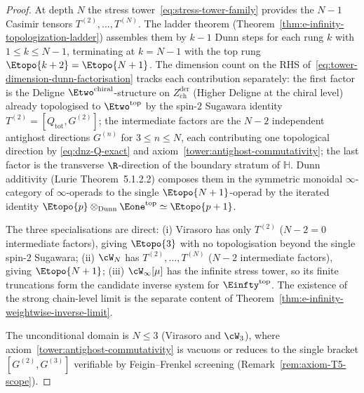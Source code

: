 \begin{proof}
At depth $N$ the stress tower~\eqref{eq:stress-tower-family} provides
the $N - 1$ Casimir tensors $T^{(2)}, \ldots, T^{(N)}$. The ladder
theorem (Theorem~\ref{thm:e-infinity-topologization-ladder}) assembles
them by $k - 1$ Dunn steps for each rung $k$ with $1 \le k \le N - 1$,
terminating at $k = N - 1$ with the top rung $\Etopo{k + 2} = \Etopo{N+1}$.
The dimension count on the RHS of~\eqref{eq:tower-dimension-dunn-factorisation}
tracks each contribution separately: the first factor is the Deligne
$\Etwo^{\mathrm{chiral}}$-structure on $Z^{\mathrm{der}}_{\mathrm{ch}}$
(Higher Deligne at the chiral level) already topologised to
$\Etwo^{\mathrm{top}}$ by the spin-$2$ Sugawara identity
$T^{(2)} = [Q_{\mathrm{tot}}, G^{(2)}]$; the intermediate factors are
the $N - 2$ independent antighost directions $G^{(n)}$ for
$3 \le n \le N$, each contributing one topological direction by
\eqref{eq:dnz-Q-exact} and axiom~\ref{tower:antighost-commutativity};
the last factor is the transverse $\R$-direction of the boundary stratum
of $\mathbb{H}$. Dunn additivity
(Lurie\,\cite{HA}\,Theorem~5.1.2.2) composes them in the symmetric
monoidal $\infty$-category of $\infty$-operads to the single
$\Etopo{N+1}$-operad by the iterated identity
$\Etopo{p} \otimes_{\mathrm{Dunn}} \Eone^{\mathrm{top}} \simeq \Etopo{p+1}$.

The three specialisations are direct: (i) Virasoro has only $T^{(2)}$
($N - 2 = 0$ intermediate factors), giving $\Etopo{3}$ with no
topologisation beyond the single spin-$2$ Sugawara; (ii) $\cW_N$ has
$T^{(2)}, \ldots, T^{(N)}$ ($N - 2$ intermediate factors), giving
$\Etopo{N+1}$; (iii) $\cW_\infty[\mu]$ has the infinite stress tower,
so its finite truncations form the candidate inverse system for
$\Einfty^{\mathrm{top}}$. The existence of the strong chain-level
limit is the separate content of
Theorem~\ref{thm:e-infinity-weightwise-inverse-limit}.

The unconditional domain is $N \le 3$ (Virasoro and $\cW_3$), where
axiom~\ref{tower:antighost-commutativity} is vacuous or reduces to the
single bracket $[G^{(2)}, G^{(3)}]$ verifiable by Feigin--Frenkel
screening (Remark~\ref{rem:axiom-T5-scope}).
\end{proof}


